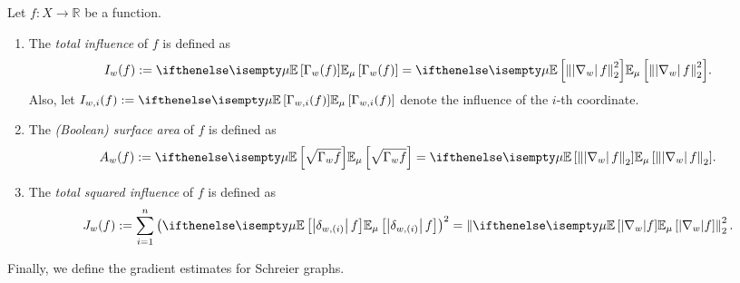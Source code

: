 \begin{definition}
    Let $f: X \to \mathbb{R}$ be a function.

    \begin{enumerate}[(1)]
        \item The \textit{total influence} of $f$ is defined as
        \begin{align*}
            I_w(f) := \E[\mu]{\Gamma_{w}(f)} = \E[\mu]{\norm{\abs{\nabla_w} f}^2_2}.
        \end{align*}
        Also, let $I_{w,i}(f) := \E[\mu]{\Gamma_{w,i}(f)}$ denote the influence of the $i$-th coordinate.

        \item The \textit{(Boolean) surface area} of $f$ is defined as
        \begin{align*}
            A_w(f) := \E[\mu]{\sqrt{\Gamma_wf}} = \E[\mu]{\norm{\abs{\nabla_w} f}_2}.
        \end{align*}

        \item The \textit{total squared influence} of $f$ is defined as
        \begin{align*}
            J_{w}(f) := \sum_{i=1}^n \tp{\E[\mu]{\abs{\delta_{w,(i)}} f}}^2 = \norm{\E[\mu]{|\nabla_w| f}}^2_2.
        \end{align*}
    \end{enumerate}
\end{definition}


Finally, we define the gradient estimates for Schreier graphs.

